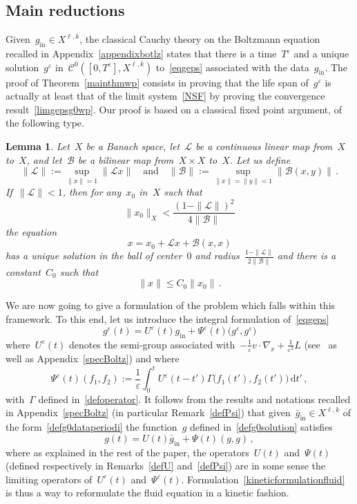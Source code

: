 \documentclass[11pt]{article}
\newtheorem{lemm}[theo]{Lemma}
\theoremstyle{definition}
\numberwithin{equation}{section}
\numberwithin{figure}{section}
\numberwithin{table}{section}
\newcommand*{\dd}{\mathrm{d}}
\newcommand*{\dt}{\dd t}
\newcommand*\eps{{\varepsilon}}
\newcommand*\e{{\varepsilon}}
\DeclareMathOperator{\inn}{in}
\begin{document}
\subsection{Main reductions}
Given~$g_{\inn} \in X^{{\ell},k}$, the classical Cauchy theory on the Boltzmann equation recalled in Appendix~\ref{appendixbotlz} states that there is a time~$T^\eps$ and a unique solution~$g^\e $ in~$ \mathcal{C}^0([0,T^\e],X^{{\ell},k})$ to~\eqref{eqgeps} associated with the data~$g_{\inn}$. The proof of Theorem~\ref{mainthmwp} consists in proving that the life span of~$g^\eps$ is actually at least that of the limit system~\eqref{NSF} by proving the convergence result~\eqref{limgepsg0wp}. Our proof is based on a classical fixed point argument, of the following type.
\begin{lemm}\label{cacciopoli+}
Let~$X$ be a Banach space, let~${\mathcal L}$ be a continuous linear map from~$X$ to~$X$, and let~${\mathcal B}$ be a bilinear map from~$X\times X$ to~$X$. Let us define
\[
\|{\mathcal L}\| := \sup_{\|x\|=1} \|{\mathcal L}x\|\quad\text{and}\quad
\|{\mathcal B}\| := \sup_{\|x\|=\|y\|=1} \|{\mathcal B}(x,y)\| \,.
\]
If~$\|{\mathcal L}\| <1$, then for any~$x_{0}$ in~$X$ such that
\[
\|x_{0}\|_{X}< \frac{(1-\|{\mathcal L}\|)^2} {4\|{\mathcal B}\| }
\]
the equation
\[
x=x_{0}+{\mathcal L}x+{\mathcal B}(x,x)
\]
has a unique solution in the ball of center~$0$ and radius~$\frac {1-\|{\mathcal L}\| }{2\|{\mathcal B}\|} $ and there is a constant~$C_0$ such that
\[
\|x\|\le C _0\|x_0\| \,.
\]
\end{lemm}

We are now going to give a formulation of the problem which falls within this framework. To this end, let us introduce the integral formulation of~\eqref{eqgeps}
\begin{equation}\label{integralformulation}
g^\e(t) =U^\eps(t) g _{\inn} + \Psi^\e(t) \big(g^\e,g^\e\big)
\end{equation}
where~$U^\eps(t) $ denotes the semi-group associated with~$- \frac1\e v \cdot\nabla_x + \frac1{\e^2} L $ (see~\cite{Bardos-Ukai, Ukai} as well as Appendix~\ref{specBoltz}) and where
\begin{equation}\label{defPsiepsh1h2}
\Psi^\e(t) (f_1,f_2) :=\frac1\e \int_0^t U^\e (t-t') \Gamma \big(f_1(t'),f_2(t')\big) \, \dt' \,,
\end{equation}
with~$\Gamma$ defined in~\eqref{defoperator}. It follows from the results and notations recalled in Appendix~\ref{specBoltz} (in particular Remark~\ref{defPsi}) that given~$\bar g_{\inn} \in X^{{\ell},k}$ of the form~\eqref{defg0dataperiodi} the function~$g$ defined in~\eqref{defg0solution} satisfies
\begin{equation}\label{kineticformulationfluid}
g(t) =U (t)\bar g_{\inn} + \Psi(t) (g,g) \,,
\end{equation}
where as explained in the rest of the paper, the operators~$U (t)$ and~$ \Psi(t)$ (defined respectively in Remarks~\ref{defU} and~\ref{defPsi}) are in some sense the limiting operators of~$U^\eps (t)$ and~$ \Psi^\eps(t)$. Formulation~\eqref{kineticformulationfluid} is thus a way to reformulate the fluid equation in a kinetic fashion.
\end{document}
